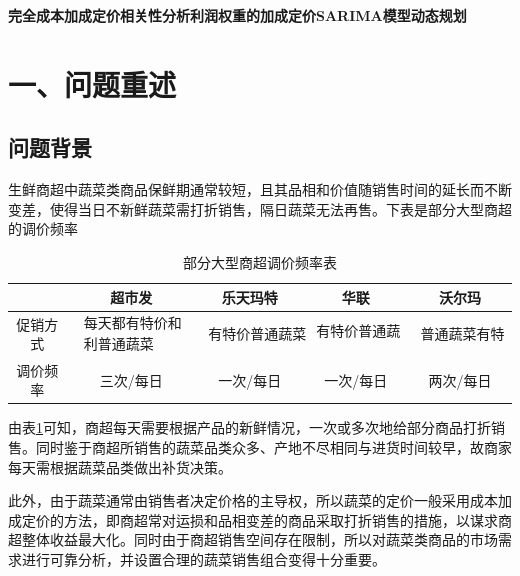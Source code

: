 \documentclass{my_paper}
\begin{document}
\begin{guanjianci}
 \quad \textbf{完全成本加成定价}\textbf{相关性分析}\quad \textbf{利润权重的加成定价}\quad \textbf{SARIMA模型}\quad \textbf{动态规划}
\end{guanjianci}







\newpage
\section{一、问题重述}
\subsection{问题背景}
生鲜商超中蔬菜类商品保鲜期通常较短，且其品相和价值随销售时间的延长而不断变差，使得当日不新鲜蔬菜需打折销售，隔日蔬菜无法再售。下表是部分大型商超的调价频率\cite{我国超市优质生鲜蔬菜动态定价问题研究}
\begin{table}[H]
    \centering
    \caption{部分大型商超调价频率表}
    \begin{tabular}{ccccc}
        \hline & 超市发 & 乐天玛特 & 华联 & 沃尔玛 \\
        \hline 促销方式 & 
        $\begin{array}{l}\text { 每天都有特价和让 } 
        \text {  } \\
        \text { 利普通蔬菜 }\end{array}$ &
         $\begin{array}{l}\text {有}
        \text {特价普通蔬}
        \text {菜}\end{array}$ &
         $\begin{array}{l}\text {有} 
        \text {特价普通蔬菜} \\
        \end{array}$ & 
        $\begin{array}{l}\text {普}
        \text {通蔬菜有特价} \end{array}$ \\
        调价频率  & 三次/每日 & 一次/每日 & 一次/每日 & 两次/每日 \\
        \hline
        \end{tabular}
    \label{商超调价频率}
\end{table}
由表\ref{商超调价频率}可知，商超每天需要根据产品的新鲜情况，一次或多次地给部分商品打折销售。同时鉴于商超所销售的蔬菜品类众多、产地不尽相同与进货时间较早，故商家每天需根据蔬菜品类做出补货决策。\par
此外，由于蔬菜通常由销售者决定价格的主导权，所以蔬菜的定价一般采用成本加成定价的方法\cite{wang2003}，即商超常对运损和品相变差的商品采取打折销售的措施，以谋求商超整体收益最大化。同时由于商超销售空间存在限制，所以对蔬菜类商品的市场需求进行可靠分析，并设置合理的蔬菜销售组合变得十分重要。
\end{document}
